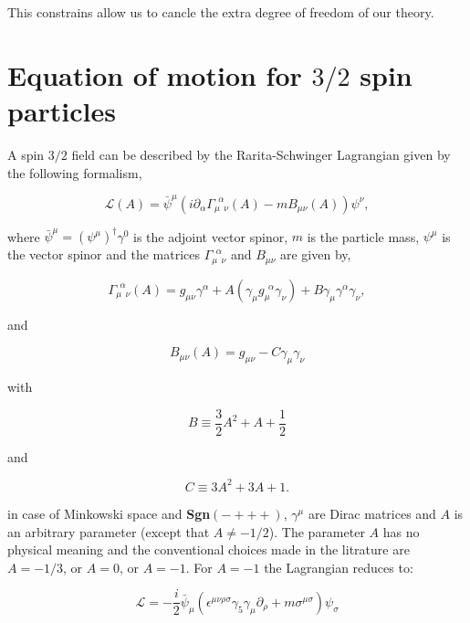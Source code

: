 This constrains allow us to cancle the extra degree of freedom of our theory.

\section{Equation of motion for $3/2$ spin particles}

A spin $3/2$ field can be described by the Rarita-Schwinger Lagrangian given by the following formalism,

\begin{equation}
   \mathcal{L} (A) = \bar{\psi}^{\mu} \left(i \partial_{\alpha} \Gamma_{\mu~~\nu}^{~~\alpha}(A) - mB_{\mu\nu}(A) \right)\psi^{\nu},
\end{equation}

where $\bar{\psi}^{\mu} = (\psi^{\mu})^{\dagger}\gamma^0$ is the adjoint vector spinor, $m$ is the particle mass, $\psi^{\mu}$ is the vector spinor and the matrices $\Gamma_{\mu~~\nu}^{~~\alpha}$ and $B_{\mu\nu}$ are given by,

\begin{equation}
   \Gamma_{\mu~~\nu}^{~~\alpha}(A) = g_{\mu\nu} \gamma^{\alpha} + A(\gamma_{\mu}g_{\mu}^{~~\alpha}\gamma_{\nu}) + B\gamma_{\mu}\gamma^{\alpha}\gamma_{\nu},
\end{equation}

and 

\begin{equation}
   B_{\mu\nu}(A) = g_{\mu\nu} -C \gamma_{\mu}\gamma_{\nu}
\end{equation}

with

\begin{equation}
   B \equiv \frac{3}{2}A^2 + A + \frac{1}{2}
\end{equation}

and

\begin{equation}
   C \equiv 3A^2 + 3A + 1.
\end{equation}

in case of Minkowski space and \textbf{Sgn}$(-+++)$, $\gamma^{\mu}$ are Dirac matrices and $A$ is an arbitrary parameter (except that $A \neq-1/2$). The parameter $A$ has no physical meaning and the conventional choices made in the litrature are $A=-1/3$, or $A=0$, or $A=-1$. For $A=-1$ the Lagrangian reduces to:

\begin{equation}
   \mathcal{L} = -\frac{i}{2}\bar{\psi}_{\mu} (\epsilon^{\mu\nu\rho\sigma}\gamma_{5}\gamma_{\mu}\partial_{\rho}+m\sigma^{\mu\sigma}) \psi_{\sigma}
\end{equation}


